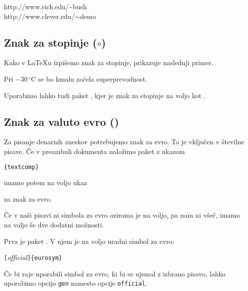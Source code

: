 \begin{example}
http://www.rich.edu/\~{}bush \\
http://www.clever.edu/$\sim$demo
\end{example}  
 
\subsection{Znak za stopinje ($\circ$)}

Kako v \LaTeX{}u izpišemo znak za stopinje, prikazuje naslednji primer.

\begin{example}
Pri $-30\,^{\circ}\mathrm{C}$
se bo kmalu začela superprevodnost.
\end{example}

Uporabimo lahko tudi paket , kjer je znak za stopinje na voljo kot .


\subsection{Znak za valuto evro \texorpdfstring{(\officialeuro)}{}}

Za pisanje denarnih zneskov potrebujemo znak za evro. Ta je vključen
v številne pisave. Če v preambuli dokumenta
naložimo paket  z ukazom
\begin{lscommand}
\verb|{textcomp}| 
\end{lscommand}
imamo potem na voljo ukaz
\begin{lscommand}
\end{lscommand}
za znak za evro.

Če v naši pisavi ni simbola za evro oziroma je na voljo, pa
nam ni všeč, imamo na voljo še dve dodatni možnosti.

Prva je paket . V njem je na voljo uradni simbol
za evro:
\begin{lscommand}
\verb|[|\emph{official}\verb|]{eurosym}|
\end{lscommand}
Če bi raje uporabili simbol za evro, ki bi se ujemal z izbrano pisavo, 
lahko uporabimo opcijo 
\texttt{gen} namesto opcije \texttt{official}.



